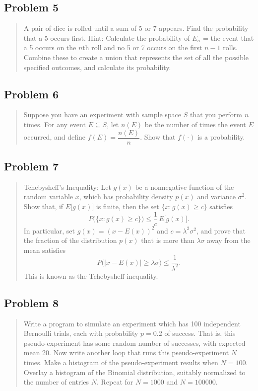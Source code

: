 \subsection*{Problem 5}
\begin{quote}
A pair of dice is rolled until a sum of 5 or 7 appears. Find the probability that a 5 occurs first. Hint: Calculate the probability of $E_n$ = the event that a 5 occurs on the $n$th roll and no 5 or 7 occurs on the first $n-1$ rolls. Combine these to create a union that represents the set of all the possible specified outcomes, and calculate its probability.
\end{quote}

\subsection*{Problem 6}
\begin{quote}
Suppose you have an experiment with sample space $S$ that you perform $n$ times. For any event $E\subseteq S$, let $n(E)$ be the number of times the event $E$ occurred, and define $f(E)=\dfrac{n(E)}{n}$. Show that $f(\cdot)$ is a probability.
\end{quote}

\subsection*{Problem 7}
\begin{quote}
Tchebysheff's Inequality: Let $g(x)$ be a nonnegative function of the random variable $x$, which has probability density $p(x)$ and variance $\sigma^2$. Show that, if $E\big[g(x)\big]$ is finite, then the set $\{x: g(x)\ge c\}$ satisfies
\[
	P\big(\{x: g(x)\ge c\}\big) \le \frac{1}{c}\, E\big[g(x)\big].
\]
In particular, set $g(x)=(x-E(x))^2$ and $c=\lambda^2\sigma^2$, and prove that the fraction of the distribution $p(x)$ that is more than $\lambda\sigma$ away from the mean satisfies
\[
	P\big(|x-E(x)|\ge \lambda\sigma\big) \le \frac{1}{\lambda^2}.
\]
This is known as the Tchebysheff inequality.
\end{quote}

\subsection*{Problem 8}
\begin{quote}
Write a program to simulate an experiment which has 100 independent Bernoulli trials, each with probability $p=0.2$ of success. That is, this pseudo-experiment has some random number of successes, with expected mean 20. Now write another loop that runs this pseudo-experiment $N$ times. Make a histogram of the pseudo-experiment results when $N=100$. Overlay a histogram of the Binomial distribution, suitably normalized to the number of entries $N$. Repeat for $N=1000$ and $N=100000$.
\end{quote}

